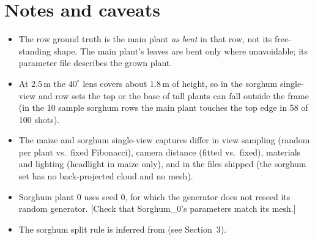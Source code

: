 \documentclass[11pt]{article}
\newcommand{\file}[1]{\path{#1}}
\newcommand{\todo}[1]{\textcolor{red!70!black}{[#1]}}
\begin{document}
\section{Notes and caveats}
\begin{itemize}
\item The row ground truth is the main plant \emph{as bent} in that row, not its free-standing shape. The main plant's
leaves are bent only where unavoidable; its parameter file describes the grown plant.
\item At 2.5\,m the $40^\circ$ lens covers about 1.8\,m of height, so in the sorghum single-view and row sets the top or
the base of tall plants can fall outside the frame (in the 10 sample sorghum rows the main plant touches the top edge in
58 of 100 shots).
\item The maize and sorghum single-view captures differ in view sampling (random per plant vs.\ fixed Fibonacci), camera
distance (fitted vs.\ fixed), materials and lighting (headlight in maize only), and in the files shipped (the sorghum set
has no back-projected cloud and no mesh).
\item Sorghum plant 0 uses seed 0, for which the generator does not reseed its random generator.
\todo{Check that Sorghum\_0's parameters match its mesh.}
\item The sorghum split rule is inferred from \file{assignment.csv} (see Section~3).
\end{itemize}
\end{document}
